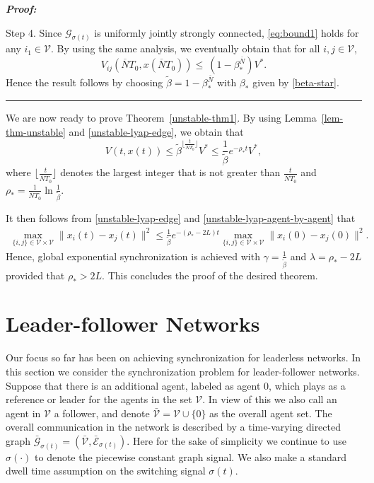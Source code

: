 \documentclass[a4paper, 11pt]{article}
\newenvironment{IEEEproof}[1][\bf Proof]{\smallskip\par\noindent\textit{#1: }}{\hspace*{\fill} \rule{6pt}{6pt}\smallskip}
\begin{document}
\begin{IEEEproof}
\vspace*{2mm}

\noindent Step 4. Since $\mathcal{G}_{\sigma(t)}$ is uniformly jointly strongly connected, \eqref{eq:bound1} holds for any $i_1\in \mathcal{V}$. By using the same analysis, we eventually obtain that for all $i,j\in \mathcal{V}$,
$$
V_{ij}(\overline{N}T_0, x(\overline{N}T_0))\leq ~(1-\beta_*^{\overline{N}})V^*.$$
Hence the result follows by choosing $\tilde{\beta}=1-\beta_*^{\overline{N}}$ with $\beta_*$ given by \eqref{beta-star}.
\end{IEEEproof}

We are now ready to prove Theorem~\ref{unstable-thm1}.
By using Lemma~\ref{lem-thm-unstable} and \eqref{unstable-lyap-edge}, we obtain that
\begin{equation*}
V(t, x(t)) \leq \tilde{\beta}^{\lfloor{{\frac{t}{\overline{N}T_0}}}\rfloor}V^*
\leq \frac{1}{\tilde{\beta}} e^{-\rho_* t}V^*,
\end{equation*}
where $\lfloor{\frac{t}{\overline{N}T_0}}\rfloor$ denotes the largest integer that is not greater than
$\frac{t}{\overline{N}T_0}$ and $\rho_* =\frac{1}{\overline{N}T_0}\ln\frac{1}{\tilde{\beta}}$.

It then follows from \eqref{unstable-lyap-edge} and \eqref{unstable-lyap-agent-by-agent} that
\begin{align*}
\max_{\{i,j\}\in\mathcal{V}\times\mathcal{V}}\|x_i(t)-x_j(t)\|^2\leq \frac{1}{\tilde{\beta}}e^{-(\rho_*-2L)t} \max_{\{i,j\}\in\mathcal{V}\times\mathcal{V}}\|x_i(0)-x_j(0)\|^2.
\end{align*}
Hence, global exponential synchronization is achieved with $\gamma=\frac{1}{\tilde{\beta}}$
and $\lambda=\rho_*-2L$ provided that $\rho_*>2L$.
This concludes the proof of the desired theorem.






\section{Leader-follower Networks}\label{sec-lf}

Our focus so far has been on achieving synchronization for leaderless networks.
In this section we consider the synchronization problem for leader-follower networks.
Suppose that there is an additional agent, labeled as agent $0$,
which plays as a reference or leader for the agents in the set $\mathcal{V}$.
In view of this we also call an agent in $\mathcal{V}$ a follower, and denote  $\bar{\mathcal{V}}=\mathcal{V} \cup \{0\}$ as the overall agent set. The overall communication in the network is described by a time-varying directed graph $\bar{\mathcal{G}}_{\sigma(t)}=(\bar{\mathcal{V}}, \bar{\mathcal{E}}_{\sigma(t)})$. Here for the sake of simplicity we continue to use $\sigma(\cdot)$ to denote the piecewise constant graph signal.
We also make a standard dwell time assumption \cite{liberzon-morse} on  the switching signal $\sigma(t)$. 
\end{document}
